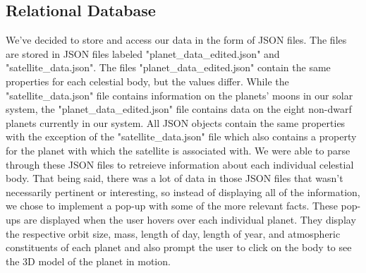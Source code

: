 \documentclass[journal]{vgtc}                %
\begin{document}
\subsection{Relational Database}
We've decided to store and access our data in the form of JSON files. The files are stored in JSON files labeled "planet\_data\_edited.json" and "satellite\_data.json". The files "planet\_data\_edited.json" contain the same properties for each celestial body, but the values differ. While the "satellite\_data.json" file contains information on the planets' moons in our solar system, the "planet\_data\_edited.json"  file contains data on the eight non-dwarf planets currently in our system. All JSON objects contain the same properties with the exception of the "satellite\_data.json" file which also contains a property for the planet with which the satellite is associated with. We were able to parse through these JSON files to retreieve information about each individual celestial body. That being said, there was a lot of data in those JSON files that wasn't necessarily pertinent or interesting, so instead of displaying all of the information, we chose to implement a pop-up with some of the more relevant facts. These pop-ups are displayed when the user hovers over each individual planet. They display the respective orbit size, mass, length of day, length of year, and atmospheric constituents of each planet and also prompt the user to click on the body to see the 3D model of the planet in motion. 
\end{document}

